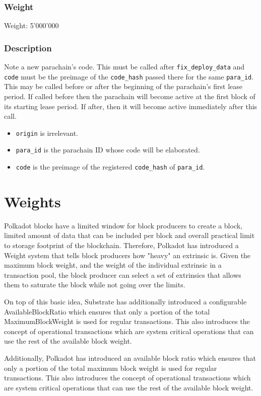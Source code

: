 \documentclass[11pt,a4paper]{article}
\begin{document}
\subsubsection*{Weight}
Weight: 5'000'000
\subsubsection*{Description}
Note a new parachain's code. This must be called after \verb|fix_deploy_data| and \verb|code| must be the preimage of the \verb|code_hash| passed there for the same \verb|para_id|. This may be called before or after the beginning of the parachain's first lease period. If called before then the parachain will become active at the first block of its starting lease period. If after, then it will become active immediately after this call.

\begin{itemize}
\item \verb|origin| is irrelevant.
\item \verb|para_id| is the parachain ID whose code will be elaborated.
\item \verb|code| is the preimage of the registered \verb|code_hash| of \verb|para_id|.
\end{itemize}

\section{Weights}
Polkadot blocks have a limited window for block producers to create a block,
limited amount of data that can be included per block and overall practical limit
to storage footprint of the blockchain. Therefore, Polkadot has introduced a Weight
system that tells block producers how "heavy" an extrinsic is. Given the maximum
block weight, and the weight of the individual extrinsic in a transaction pool,
the block producer can select a set of extrinsics that allows them to saturate the
block while not going over the limits.

\newline

On top of this basic idea, Substrate has additionally introduced a configurable
AvailableBlockRatio which ensures that only a portion of the total MaximumBlockWeight
is used for regular transactions. This also introduces the concept of operational
transactions which are system critical operations that can use the rest of the
available block weight.

\newline

Additionally, Polkadot has introduced an available block ratio which ensures that
only a portion of the total maximum block weight is used for regular transactions.
This also introduces the concept of operational transactions which are system
critical operations that can use the rest of the available block weight.

\newline
\end{document}
